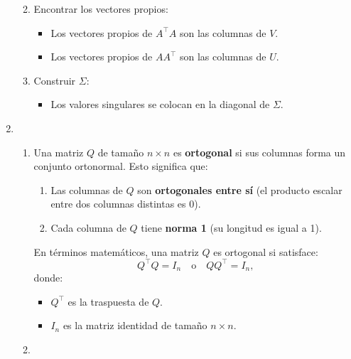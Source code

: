 \begin{enumerate}[label=\color{red}\textbf{\arabic*)}]
\begin{enumerate}[label=Paso \arabic*:]
\begin{itemize}[label=\textbullet]
        \end{itemize}
    \item Encontrar los vectores propios:
        \begin{itemize}[label=\textbullet]
            \item Los vectores propios de $A^\intercal A$ son las columnas de $V$.
            \item Los vectores propios de  $A A^\intercal$ son las columnas de $U$.
        \end{itemize}
    \item Construir $\Sigma$: 
         \begin{itemize}[label=\textbullet]
            \item Los valores singulares se colocan en la diagonal de $\Sigma$.
        \end{itemize}
\end{enumerate}
\item {}
    \begin{enumerate}[label=\color{red}\textbf{\alph*)}]
        \item {}

            Una matriz $Q$ de tamaño  $n\times n$ es \textbf{ortogonal} si sus columnas forma un conjunto ortonormal. Esto significa que:
           \begin{enumerate}[label=Paso \arabic*:]
               \item Las columnas de $Q$ son  \textbf{ortogonales entre sí} (el producto escalar entre dos columnas distintas es $0$).
               \item Cada columna de $Q$ tiene  \textbf{norma 1} (su longitud es igual a 1). 
           \end{enumerate} 
           En términos matemáticos, una matriz $Q$ es ortogonal si satisface:  \[
           Q^\intercal Q=I_n\quad \text{o}\quad Q Q^\intercal=I_n,
           \] 
           donde: 
           \begin{itemize}[label=\textbullet]
               \item $Q^\intercal$ es la traspuesta de $Q$.
               \item  $I_n$ es la matriz identidad de tamaño  $n\times n$.
           \end{itemize}
        \item {}


\end{enumerate}
\end{enumerate}
